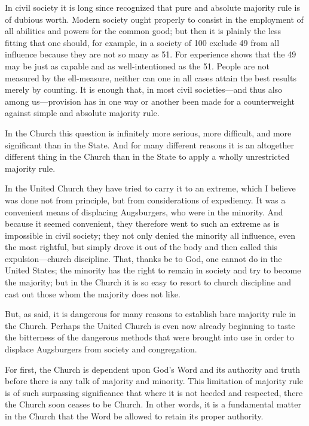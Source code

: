 In civil society it is long since recognized that pure and absolute majority rule is of dubious worth. Modern society ought properly to consist in the employment of all abilities and powers for the common good; but then it is plainly the less fitting that one should, for example, in a society of 100 exclude 49 from all influence because they are not so many as 51. For experience shows that the 49 may be just as capable and as well-intentioned as the 51. People are not measured by the ell-measure, neither can one in all cases attain the best results merely by counting. It is enough that, in most civil societies—and thus also among us—provision has in one way or another been made for a counterweight against simple and absolute majority rule.

In the Church this question is infinitely more serious, more difficult, and more significant than in the State. And for many different reasons it is an altogether different thing in the Church than in the State to apply a wholly unrestricted majority rule.

In the United Church they have tried to carry it to an extreme, which I believe was done not from principle, but from considerations of expediency. It was a convenient means of displacing Augsburgers, who were in the minority. And because it seemed convenient, they therefore went to such an extreme as is impossible in civil society; they not only denied the minority all influence, even the most rightful, but simply drove it out of the body and then called this expulsion—church discipline. That, thanks be to God, one cannot do in the United States; the minority has the right to remain in society and try to become the majority; but in the Church it is so easy to resort to church discipline and cast out those whom the majority does not like.

But, as said, it is dangerous for many reasons to establish bare majority rule in the Church. Perhaps the United Church is even now already beginning to taste the bitterness of the dangerous methods that were brought into use in order to displace Augsburgers from society and congregation.

For first, the Church is dependent upon God’s Word and its authority and truth before there is any talk of majority and minority. This limitation of majority rule is of such surpassing significance that where it is not heeded and respected, there the Church soon ceases to be Church. In other words, it is a fundamental matter in the Church that the Word be allowed to retain its proper authority.

